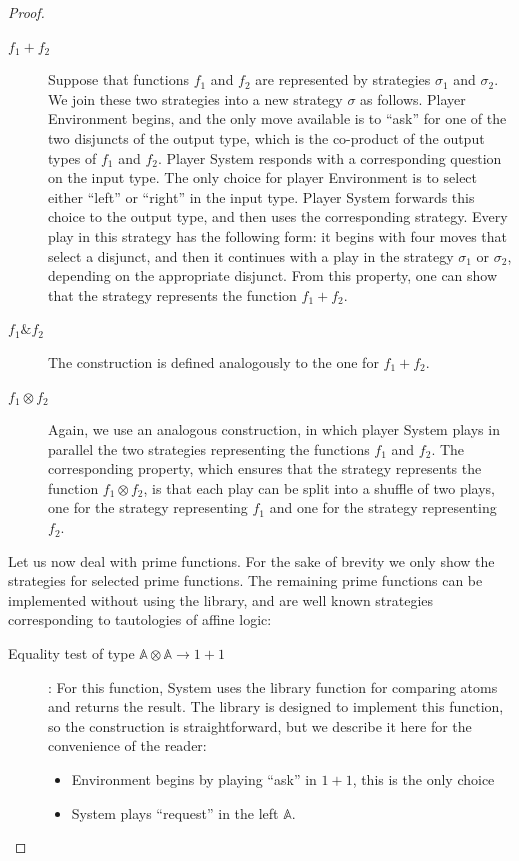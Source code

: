 \documentclass[10pt,a4paper]{amsart}
\numberwithin{equation}{section}
\theoremstyle{plain}
\newcommand{\atoms}{\mathbb A}
\begin{document}
\begin{proof}
\begin{description}
        \item[$f_1 + f_2$] Suppose that functions $f_1$ and $f_2$ are represented by strategies $\sigma_1$ and $\sigma_2$. We join these two strategies into a new strategy $\sigma$ as follows.  Player Environment begins, and the only move available is to ``ask'' for one of the two disjuncts of the output type, which is the co-product of the output types of $f_1$ and $f_2$. Player System responds with a corresponding question on the input type. The only choice for player Environment is to select either ``left'' or ``right'' in the input type. Player System forwards this choice to the output type, and then uses the corresponding strategy.  Every play in this strategy has the following form: it begins with four moves that select a disjunct, and then it continues with a play in the strategy $\sigma_1$ or $\sigma_2$, depending on  the appropriate disjunct. From this property, one can show that the strategy represents the function $f_1 + f_2$.
        \item[$f_1 \& f_2$]  The construction is defined analogously to the one for $f_1 + f_2$.
        \item[$f_1 \otimes f_2$] Again, we use an analogous construction, in which player System plays in parallel the two strategies representing the functions $f_1$ and $f_2$. The corresponding property, which ensures that the strategy represents the function $f_1 \otimes f_2$, is that each play can be split into a shuffle of two plays, one for the strategy representing $f_1$ and one for the strategy representing $f_2$.
    \end{description}
    Let us now deal with prime functions. For the sake of brevity we only show the strategies for selected prime functions. The remaining prime functions can be implemented without using  the library, and are well known strategies corresponding to tautologies of affine logic:
    \begin{description}
        \item[Equality test of type $\atoms \otimes \atoms \to 1 + 1$]:
        For this function, System uses the library function for comparing atoms 
        and returns the result. The library is designed to implement this function, so the construction is straightforward, but we describe it here for the convenience of the reader:
\begin{itemize}
    \item Environment begins by  playing ``ask'' in $1+1$, this is the only choice
    \item System  plays  ``request'' in the left $\atoms$.

\end{itemize}
\end{description}
\end{proof}
\end{document}
